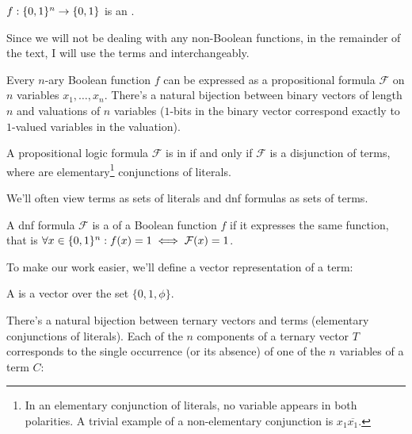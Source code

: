 \begin{definition}
$f: \{0, 1\}^n \rightarrow \{0, 1\}$ is
an .
\end{definition}

Since we will not be dealing with any non-Boolean functions,
in the remainder of the text,
I will use the terms
 and 
interchangeably.

Every $n$-ary Boolean function $f$ can be expressed
as a propositional formula $\mathcal{F}$ on $n$ variables
$x_1, \ldots, x_n$.
There's a natural bijection
between binary vectors of length $n$
and valuations of $n$ variables
($1$-bits in the binary vector
correspond exactly to $1$-valued variables
in the valuation).


\begin{definition}
A propositional logic formula $\mathcal{F}$
is in  if and only if
$\mathcal{F}$ is a disjunction of terms,
where 
are elementary\footnote{In an elementary conjunction
of literals,
no variable appears in both polarities.
A trivial example of a non-elementary conjunction
is $x_1 \overline{x_1}$.}
conjunctions of literals.

We'll often view terms as sets of literals
and \acrshort{dnf} formulas as sets of terms.
\end{definition}

A \acrshort{dnf} formula $\mathcal{F}$ is
a 
of a Boolean function $f$
if it expresses the same function,
that is
$\forall x \in \{0, 1\}^n : f(x) = 1 \iff
\mathcal{F} (x) = 1$.

To make our work easier,
we'll define a vector representation of a term:

\begin{definition}
A 
is a vector over the set
$\{0, 1, \phi\}$.
\end{definition}

There's a natural bijection between ternary vectors
and terms (elementary conjunctions of literals).
Each of the $n$ components of a ternary vector $T$
corresponds to the single occurrence (or its absence)
of one of the $n$ variables of a term $C$:

